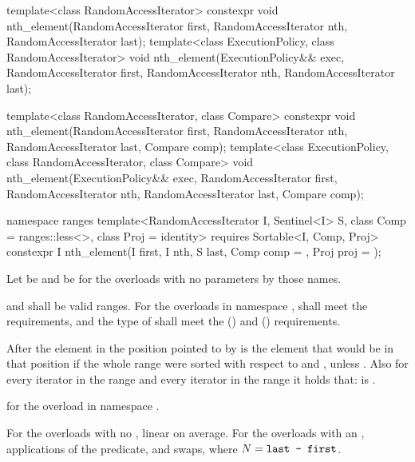 %
\begin{itemdecl}
template<class RandomAccessIterator>
  constexpr void nth_element(RandomAccessIterator first, RandomAccessIterator nth,
                             RandomAccessIterator last);
template<class ExecutionPolicy, class RandomAccessIterator>
  void nth_element(ExecutionPolicy&& exec,
                   RandomAccessIterator first, RandomAccessIterator nth,
                   RandomAccessIterator last);

template<class RandomAccessIterator, class Compare>
  constexpr void nth_element(RandomAccessIterator first, RandomAccessIterator nth,
                             RandomAccessIterator last,  Compare comp);
template<class ExecutionPolicy, class RandomAccessIterator, class Compare>
  void nth_element(ExecutionPolicy&& exec,
                   RandomAccessIterator first, RandomAccessIterator nth,
                   RandomAccessIterator last, Compare comp);

namespace ranges {
  template<RandomAccessIterator I, Sentinel<I> S, class Comp = ranges::less<>,
      class Proj = identity>
    requires Sortable<I, Comp, Proj>
    constexpr I
      nth_element(I first, I nth, S last, Comp comp = {}, Proj proj = {});
}
\end{itemdecl}

\begin{itemdescr}
\pnum
Let  be 
and  be 
for the overloads with no parameters by those names.

\pnum
\requires
{} and  shall be valid ranges.
For the overloads in namespace ,
 shall meet the
 requirements, and
the type of  shall meet the
 () and
 () requirements.

\pnum
\effects
After
the element in the position pointed to by 
is the element that would be
in that position
if the whole range were sorted with respect to  and ,
unless .
Also for every iterator
in the range
and every iterator
in the range
it holds that:
is .

\pnum
\returns
{} for the overload in namespace .

\pnum
\complexity
For the overloads with no , linear on average.
For the overloads with an ,  applications of
the predicate, and  swaps, where $N = \texttt{last - first}$.
\end{itemdescr}

